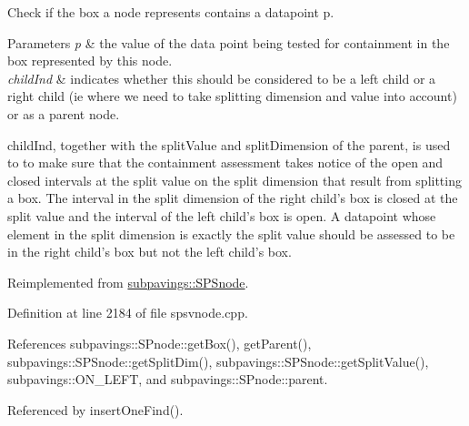 \-Check if the box a node represents contains a datapoint p. 


\begin{DoxyParams}{\-Parameters}
{\em p} & the value of the data point being tested for containment in the box represented by this node. \\
\hline
{\em child\-Ind} & indicates whether this should be considered to be a left child or a right child (ie where we need to take splitting dimension and value into account) or as a parent node.\\
\hline
\end{DoxyParams}
child\-Ind, together with the split\-Value and split\-Dimension of the parent, is used to to make sure that the containment assessment takes notice of the open and closed intervals at the split value on the split dimension that result from splitting a box. \-The interval in the split dimension of the right child's box is closed at the split value and the interval of the left child's box is open. \-A datapoint whose element in the split dimension is exactly the split value should be assessed to be in the right child's box but not the left child's box. 

\-Reimplemented from \hyperlink{classsubpavings_1_1SPSnode_a918067afb150c053f7450fd18c6ecd22}{subpavings\-::\-S\-P\-Snode}.



\-Definition at line 2184 of file spsvnode.\-cpp.



\-References subpavings\-::\-S\-Pnode\-::get\-Box(), get\-Parent(), subpavings\-::\-S\-P\-Snode\-::get\-Split\-Dim(), subpavings\-::\-S\-P\-Snode\-::get\-Split\-Value(), subpavings\-::\-O\-N\-\_\-\-L\-E\-F\-T, and subpavings\-::\-S\-Pnode\-::parent.



\-Referenced by insert\-One\-Find().



